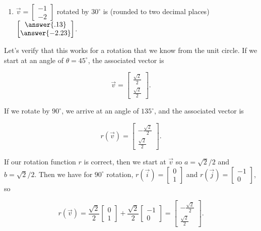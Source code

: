 \documentclass{ximera}
\begin{document}
\begin{exploration}
\begin{example}
\begin{enumerate}
            \item $\vec{v}=\begin{bmatrix} -1 \\ -2 \end{bmatrix}$ rotated by $30^\circ$ is (rounded to two decimal places) $\begin{bmatrix} \answer{.13} \\ \answer{-2.23} \end{bmatrix}$.
        \end{enumerate}

    \end{example}

    \begin{example}

        Let's verify that this works for a rotation that we know from the unit circle. If we start at an angle of $\theta = 45^\circ$, the associated vector is 
        
        $$\vec{v}=\begin{bmatrix} \frac{\sqrt{2}}{2} \\ \frac{\sqrt{2}}{2} \end{bmatrix}.$$

        If we rotate by $90^\circ$, we arrive at an angle of $135^\circ$, and the associated vector is 

        $$r(\vec{v}) = \begin{bmatrix} -\frac{\sqrt{2}}{2} \\ \frac{\sqrt{2}}{2} \end{bmatrix}.$$

        If our rotation function $r$ is correct, then we start at $\vec{v}$ so $a=\sqrt{2}/2$ and $b=\sqrt{2}/2$. Then we have for $90^\circ$ rotation, $r(\vec{i})=\begin{bmatrix} 0 \\ 1 \end{bmatrix}$ and $r(\vec{j})=\begin{bmatrix} -1 \\ 0 \end{bmatrix}$, so 

        $$r(\vec{v}) = \frac{\sqrt{2}}{2} \begin{bmatrix} 0 \\ 1 \end{bmatrix} + \frac{\sqrt{2}}{2} \begin{bmatrix} -1 \\ 0 \end{bmatrix} = \begin{bmatrix} -\frac{\sqrt{2}}{2} \\ \frac{\sqrt{2}}{2} \end{bmatrix}.$$


\end{example}
\end{exploration}
\end{document}
